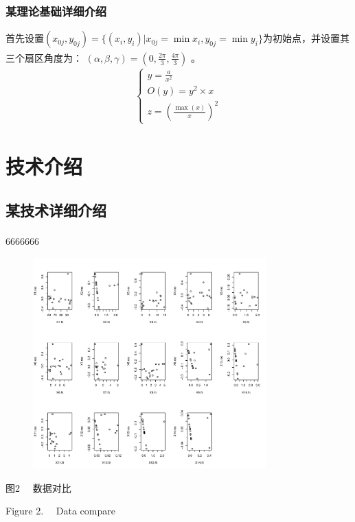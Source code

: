 \documentclass[UTF8,a4paper,12pt]{ctexart}
\begin{document}
	\subsubsection{某理论基础详细介绍}
	首先设置$(x_{0j},y_{0j}) = \{(x_i,y_i)|x_{0j}=\min x_i,y_{0j}=\min y_i\}$为初始点，并设置其三个扇区角度为：
	$(\alpha ,\beta ,\gamma) = (0,\frac{2\pi}{3} ,\frac{4\pi}{3} )$ 。\textsuperscript{\cite{Ref1}}
	\begin{equation}
		\begin{array}{c}
			\text {}\left\{\begin{array}{l}
				y=\frac{a}{x^2}\\
				O(y) = y^2\times x\\
				z=(\frac{\max(x)}{x})^2
			\end{array}\right.
		\end{array}
	\end{equation}
	

	\section{技术介绍}
	\subsection{某技术详细介绍}
	6666666\textsuperscript{\cite{Ref3}}
	\begin{figure}[!h]
		\centering
		\includegraphics[width=0.8\textwidth]{pic/cti.pdf}
		\label{tu}
	\end{figure}
	\vspace{-0.5cm}
	\begin{center}
		\fontsize{10.5pt}{\baselineskip}\heiti 图2 \ \  数据对比 \par Figure 2. \ \ Data compare
	\end{center} 
	
\end{document}
